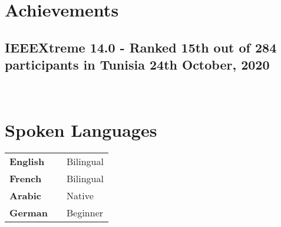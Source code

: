 \documentclass[a4,10pt]{article}
\newcommand{\subtext}[1]{
#1\par\vspace{-0.2cm}}
\newenvironment{zitemize}{
\begin{itemize}\itemsep0pt \parskip0pt \parsep1pt}
{\end{itemize}\vspace{-0.5cm}}
\newcommand{\hskills}[1]{
\textbf{\bfseries #1} }
\begin{document}
\section{Achievements} 
\subsection*{ IEEEXtreme 14.0 - Ranked 15th out of 284 participants in Tunisia \hfill 24th October, 2020} 
\subtext{} 
    \begin{zitemize}
        \  
    \end{zitemize}

\section{Spoken Languages}
\begin{tabular}{p{11em} p{1em} p{43em}}
\hskills{English}&  &  Bilingual\\
\hskills{French}&  &  Bilingual\\
\hskills{Arabic}&  &  Native\\
\hskills{German}&  &  Beginner\\
\end{tabular}

\vspace{-0.2cm}
\end{document}
